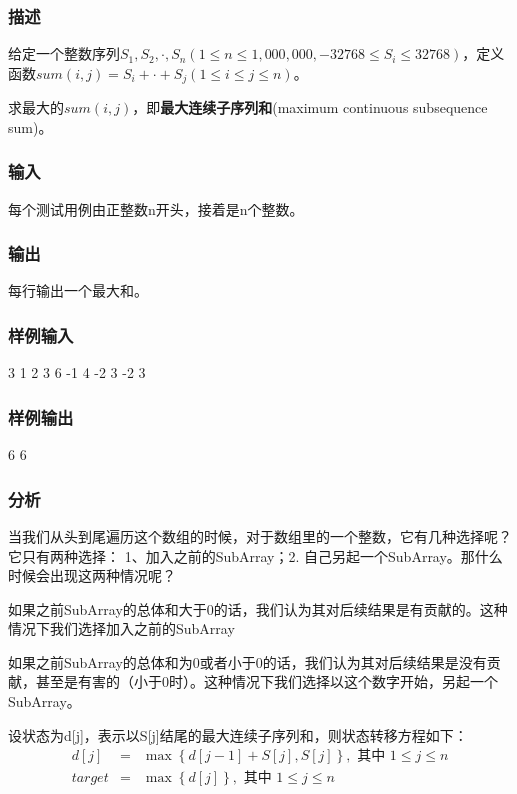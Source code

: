 \subsubsection{描述}
给定一个整数序列$S_1,S_2,\cdot,S_n(1 \leq n \leq 1,000,000, -32768 \leq S_i \leq 32768)$，定义函数$sum(i,j)=S_i+\cdot+S_j(1 \leq i \leq j \leq n)$。

求最大的$sum(i,j)$，即\textbf{最大连续子序列和}(maximum continuous subsequence sum)。

\subsubsection{输入}
每个测试用例由正整数n开头，接着是n个整数。

\subsubsection{输出}
每行输出一个最大和。

\subsubsection{样例输入}
\begin{Code}
3 1 2 3
6 -1 4 -2 3 -2 3
\end{Code}

\subsubsection{样例输出}
\begin{Code}
6
6
\end{Code}

\subsubsection{分析}
当我们从头到尾遍历这个数组的时候，对于数组里的一个整数，它有几种选择呢？它只有两种选择： 1、加入之前的SubArray；2. 自己另起一个SubArray。那什么时候会出现这两种情况呢？

如果之前SubArray的总体和大于0的话，我们认为其对后续结果是有贡献的。这种情况下我们选择加入之前的SubArray

如果之前SubArray的总体和为0或者小于0的话，我们认为其对后续结果是没有贡献，甚至是有害的（小于0时）。这种情况下我们选择以这个数字开始，另起一个SubArray。

设状态为d[j]，表示以S[j]结尾的最大连续子序列和，则状态转移方程如下：
\begin{eqnarray}
d[j] &=& \max\left\{d[j-1]+S[j],S[j]\right\}, \text{ 其中 }1 \leq j \leq n \nonumber \\
target &=& \max\left\{d[j]\right\}, \text{ 其中 }1 \leq j \leq n \nonumber
\end{eqnarray}

